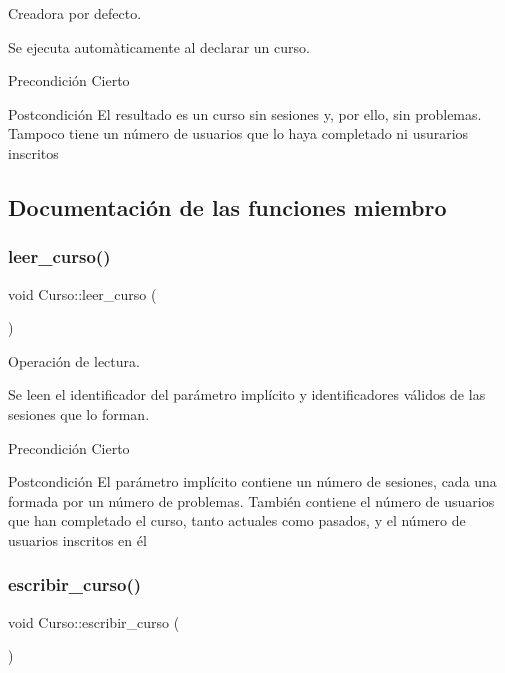 Creadora por defecto. 

Se ejecuta automàticamente al declarar un curso. \begin{DoxyPrecond}{Precondición}
Cierto 
\end{DoxyPrecond}
\begin{DoxyPostcond}{Postcondición}
El resultado es un curso sin sesiones y, por ello, sin problemas. Tampoco tiene un número de usuarios que lo haya completado ni usurarios inscritos 
\end{DoxyPostcond}


\subsection{Documentación de las funciones miembro}
\mbox{\label{class_curso_a1ea06a246148abfe3651e3aa7fa25618}} 
\subsubsection{\texorpdfstring{leer\+\_\+curso()}{leer\_curso()}}
{\footnotesize\ttfamily void Curso\+::leer\+\_\+curso (\begin{DoxyParamCaption}{ }\end{DoxyParamCaption})}



Operación de lectura. 

Se leen el identificador del parámetro implícito y identificadores válidos de las sesiones que lo forman. \begin{DoxyPrecond}{Precondición}
Cierto 
\end{DoxyPrecond}
\begin{DoxyPostcond}{Postcondición}
El parámetro implícito contiene un número de sesiones, cada una formada por un número de problemas. También contiene el número de usuarios que han completado el curso, tanto actuales como pasados, y el número de usuarios inscritos en él 
\end{DoxyPostcond}
\mbox{\label{class_curso_ac196f3a5a5d30d41d2c0a0c295f052d3}} 
\subsubsection{\texorpdfstring{escribir\+\_\+curso()}{escribir\_curso()}}
{\footnotesize\ttfamily void Curso\+::escribir\+\_\+curso (\begin{DoxyParamCaption}{ }\end{DoxyParamCaption})}



